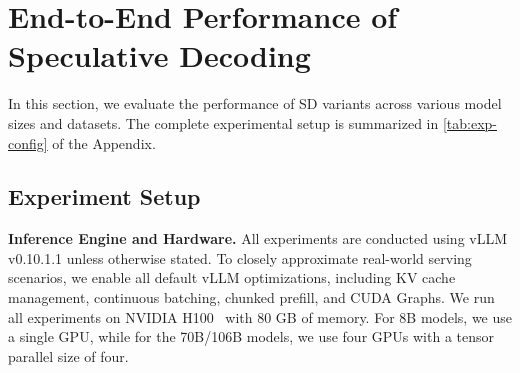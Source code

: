 \section{End-to-End Performance of Speculative Decoding}
\label{sect:e2e-perf}
In this section, we evaluate the performance of SD variants across various model sizes and datasets.
The complete experimental setup is summarized in  \autoref{tab:exp-config} of the Appendix.

\subsection{Experiment Setup}
\textbf{Inference Engine and Hardware.}
All experiments are conducted using vLLM v0.10.1.1 unless otherwise stated.
To closely approximate real-world serving scenarios, we enable all default vLLM optimizations, 
including KV cache management, continuous batching, chunked prefill, and CUDA Graphs.
We run all experiments on NVIDIA H100~\cite{h100} with 80 GB of memory.
For 8B models, we use a single GPU, while for the 70B/106B models, we use four GPUs with a tensor parallel size of four. 

